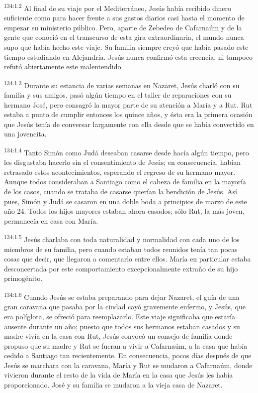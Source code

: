 \par 
\textsuperscript{134:1.2} Al final de su viaje por el Mediterráneo, Jesús había recibido dinero suficiente como para hacer frente a sus gastos diarios casi hasta el momento de empezar su ministerio público. Pero, aparte de Zebedeo de Cafarnaúm y de la gente que conoció en el transcurso de esta gira extraordinaria, el mundo nunca supo que había hecho este viaje. Su familia siempre creyó que había pasado este tiempo estudiando en Alejandría. Jesús nunca confirmó esta creencia, ni tampoco refutó abiertamente este malentendido.

\par 
\textsuperscript{134:1.3} Durante su estancia de varias semanas en Nazaret, Jesús charló con su familia y sus amigos, pasó algún tiempo en el taller de reparaciones con su hermano José, pero consagró la mayor parte de su atención a María y a Rut. Rut estaba a punto de cumplir entonces los quince años, y ésta era la primera ocasión que Jesús tenía de conversar largamente con ella desde que se había convertido en una jovencita.

\par 
\textsuperscript{134:1.4} Tanto Simón como Judá deseaban casarse desde hacía algún tiempo, pero les disgustaba hacerlo sin el consentimiento de Jesús; en consecuencia, habían retrasado estos acontecimientos, esperando el regreso de su hermano mayor. Aunque todos consideraban a Santiago como el cabeza de familia en la mayoría de los casos, cuando se trataba de casarse querían la bendición de Jesús. Así pues, Simón y Judá se casaron en una doble boda a principios de marzo de este año 24. Todos los hijos mayores estaban ahora casados; sólo Rut, la más joven, permanecía en casa con María.

\par 
\textsuperscript{134:1.5} Jesús charlaba con toda naturalidad y normalidad con cada uno de los miembros de su familia, pero cuando estaban todos reunidos tenía tan pocas cosas que decir, que llegaron a comentarlo entre ellos. María en particular estaba desconcertada por este comportamiento excepcionalmente extraño de su hijo primogénito.

\par 
\textsuperscript{134:1.6} Cuando Jesús se estaba preparando para dejar Nazaret, el guía de una gran caravana que pasaba por la ciudad cayó gravemente enfermo, y Jesús, que era políglota, se ofreció para reemplazarlo. Este viaje significaba que estaría ausente durante un año; puesto que todos sus hermanos estaban casados y su madre vivía en la casa con Rut, Jesús convocó un consejo de familia donde propuso que su madre y Rut se fueran a vivir a Cafarnaúm, a la casa que había cedido a Santiago tan recientemente. En consecuencia, pocos días después de que Jesús se marchara con la caravana, María y Rut se mudaron a Cafarnaúm, donde vivieron durante el resto de la vida de María en la casa que Jesús les había proporcionado. José y su familia se mudaron a la vieja casa de Nazaret.

